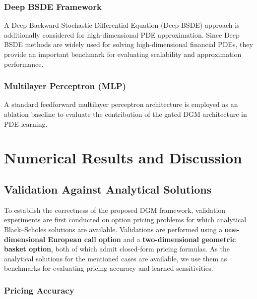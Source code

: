 \documentclass[12pt, a4paper]{article}
\begin{document}
\subsubsection*{Deep BSDE Framework}

A Deep Backward Stochastic Differential Equation (Deep BSDE) approach
is additionally considered for high-dimensional PDE approximation.
Since Deep BSDE methods are widely used for solving high-dimensional
financial PDEs, they provide an important benchmark for evaluating
scalability and approximation performance.

\subsubsection*{Multilayer Perceptron (MLP)}

A standard feedforward multilayer perceptron architecture is employed
as an ablation baseline to evaluate the contribution of the gated DGM
architecture in PDE learning.


\section{Numerical Results and Discussion}

\subsection{Validation Against Analytical Solutions}

To establish the correctness of the proposed DGM framework, validation
experiments are first conducted on option pricing problems for which
analytical Black--Scholes solutions are available. Validations are
performed using a \textbf{one-dimensional European call option} and a
\textbf{two-dimensional geometric basket option}, both of which admit
closed-form pricing formulas. As the analytical solutions for the
mentioned cases are available, we use them as benchmarks for evaluating
pricing accuracy and learned sensitivities.

\subsubsection{Pricing Accuracy}
\end{document}
